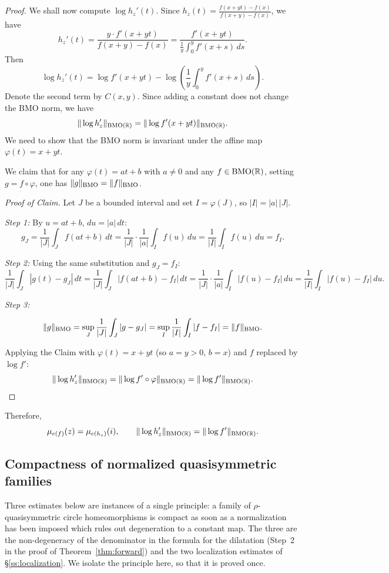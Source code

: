 \begin{proof}
	We shall now compute $\log h_z'(t)$. Since $h_z(t) = \frac{f(x+yt) - f(x)}{f(x+y) - f(x)}$, we have
	\[
	h_z'(t) = \frac{y \cdot f'(x+yt)}{f(x+y) - f(x)} = \frac{f'(x+yt)}{\frac{1}{y}\int_0^y f'(x+s)\,ds}.
	\]
	Then
	\[
	\log h_z'(t) = \log f'(x+yt) - \log\left(\frac{1}{y}\int_0^y f'(x+s)\,ds\right).
	\]
	Denote the second term by $C(x,y)$. Since adding a constant does not change the BMO norm, we have
	\[
	\|\log h_z'\|_{\mathrm{BMO}(\mathbb{R})} = \|\log f'(x + yt)\|_{\mathrm{BMO}(\mathbb{R})}.
	\]
	We need to show that the BMO norm is invariant under the affine map $\varphi(t) = x + yt$.
	
	\medskip
	We claim that for any  $\varphi(t) = at + b$ with $a \neq 0$ and any $f \in \mathrm{BMO}(\mathbb{R})$, setting $g = f \circ \varphi$, one has $\|g\|_{\mathrm{BMO}} = \|f\|_{\mathrm{BMO}}$.
	
	\medskip
	\noindent\textit{Proof of Claim.}
	Let $J$ be a bounded interval and set $I = \varphi(J)$, so $|I| = |a|\,|J|$.
	
	\textit{Step 1:}
	By $u = at + b$, $du = |a|\,dt$:
	\[
	g_J = \frac{1}{|J|}\int_J f(at+b)\,dt = \frac{1}{|J|}\cdot\frac{1}{|a|}\int_I f(u)\,du = \frac{1}{|I|}\int_I f(u)\,du = f_I.
	\]
	
	\textit{Step 2: }
	Using the same substitution and $g_J = f_I$:
	\[
	\frac{1}{|J|}\int_J |g(t) - g_J|\,dt = \frac{1}{|J|}\int_J |f(at+b) - f_I|\,dt = \frac{1}{|J|}\cdot\frac{1}{|a|}\int_I |f(u) - f_I|\,du = \frac{1}{|I|}\int_I |f(u) - f_I|\,du.
	\]
	
	\textit{Step 3: }
	
	\[
	\|g\|_{\mathrm{BMO}} = \sup_J \frac{1}{|J|}\int_J |g - g_J| = \sup_I \frac{1}{|I|}\int_I |f - f_I| = \|f\|_{\mathrm{BMO}}.
	\]
	
	\medskip
	Applying the Claim with $\varphi(t) = x + yt$ (so $a = y > 0$, $b = x$) and $f$ replaced by $\log f'$:
	\[
	\|\log h_z'\|_{\mathrm{BMO}(\mathbb{R})} = \|\log f' \circ \varphi\|_{\mathrm{BMO}(\mathbb{R})} = \|\log f'\|_{\mathrm{BMO}(\mathbb{R})}.
	\]
\end{proof}

Therefore,
\[
\mu_{e(f)}(z) = \mu_{e(h_z)}(i),\qquad
\|\log h_z'\|_{\mathrm{BMO}(\mathbb{R})} = \|\log f'\|_{\mathrm{BMO}(\mathbb{R})}.
\]

\subsection{Compactness of normalized quasisymmetric families}\label{ss:compactness}

Three estimates below are instances of a single principle: a family of
$\rho$-quasisymmetric circle homeomorphisms is compact as soon as a
normalization has been imposed which rules out degeneration to a constant map.
The three are the non-degeneracy of the denominator in the formula for the
dilatation (Step~2 in the proof of Theorem~\ref{thm:forward}) and the two localization estimates of
\S\ref{ss:localization}. We isolate the principle here, so that it is proved
once.

